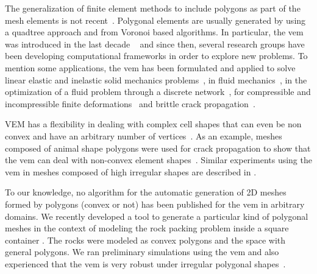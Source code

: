\documentclass[lineno,pdflatex,sn-mathphys]{sn-jnl}%
\theoremstyle{thmstyleone}%
\theoremstyle{thmstyletwo}%
\theoremstyle{thmstylethree}%
\begin{document}
The generalization of finite element methods to include polygons as part of the mesh elements is not recent~\cite{zbMATH03504364, Sukumar2006,tabarraei2008extended}.  Polygonal elements are usually generated by using a quadtree approach and from Voronoi based algorithms. In particular, the {\sc vem} was introduced in the last decade  ~\cite{Basisprinciples,Brezzi2015} and since then, several research groups have been developing computational frameworks
in order to explore  new problems. To mention some  applications, the {\sc vem} has been formulated and applied to solve linear elastic and inelastic solid mechanics problems~\cite{da2015virtual}, in fluid mechanics~\cite{ErnestoBRinkmanFluid, ErnestoQuasiNewtwon}, in the optimization
of a fluid problem through a discrete network~\cite{benedetto2014virtual}, for compressible and incompressible finite deformations~\cite{Wriggers2017,Wriggers2017a} and brittle crack propagation~\cite{HUSSEIN201915}. 

VEM has a flexibility in dealing with complex cell shapes that can even be non convex and have an arbitrary number of vertices~\cite{Aldakheel_2019}. As an example, meshes composed of animal shape polygons were used for  crack propagation to show that  the {\sc vem}  can deal with non-convex element shapes~\cite{Wriggers2019}. Similar experiments using the {\sc vem} in  meshes composed of high irregular shapes are described in \cite{PARK2019669, CHI2017148}. 

To our knowledge, no algorithm for the automatic generation of 2D meshes formed by polygons (convex or not) has been published for the {\sc vem} in arbitrary domains. We recently developed a tool to  generate a particular kind of polygonal meshes in the context of modeling the rock packing problem  inside a square container \cite{PackingJoaquin}. The rocks were modeled as convex polygons and the space  with general polygons. We ran preliminary simulations using the {\sc vem} and also experienced that the {\sc vem} is very robust under  irregular polygonal shapes~\cite{PackingJoaquin}.
\end{document}

